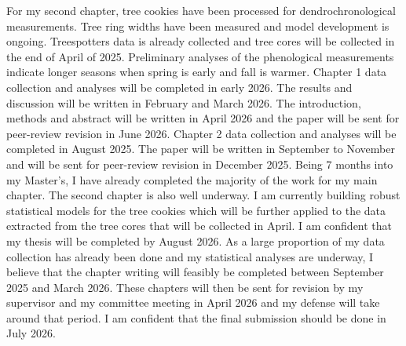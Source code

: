 \documentclass[11pt,letter]{article}
\begin{document}
For my second chapter, tree cookies have been processed for dendrochronological measurements. Tree ring widths have been measured and model development is ongoing. Treespotters data is already collected and tree cores will be collected in the end of April of 2025. Preliminary analyses of the phenological measurements indicate longer seasons when spring is early and fall is warmer. 
Chapter 1 data collection and analyses will be completed in early 2026. The results and discussion will be written in February and March 2026. The introduction, methods and abstract will be written in April 2026 and the paper will be sent for peer-review revision in June 2026.
Chapter 2 data collection and analyses will be completed in August 2025. The paper will be written in September to November and will be sent for peer-review revision in December 2025.
Being 7 months into my Master’s, I have already completed the majority of the work for my main chapter. The second chapter is also well underway. I am currently building robust statistical models for the tree cookies which will be further applied to the data extracted from the tree cores that will be collected in April.
I am confident that my thesis will be completed by August 2026. As a large proportion of my data collection has already been done and my statistical analyses are underway, I believe that the chapter writing will feasibly be completed between September 2025 and March 2026. These chapters will then be sent for revision by my supervisor and my committee meeting in April 2026 and my defense will take around that period. I am confident that the final submission should be done in July 2026.

\end{document}
